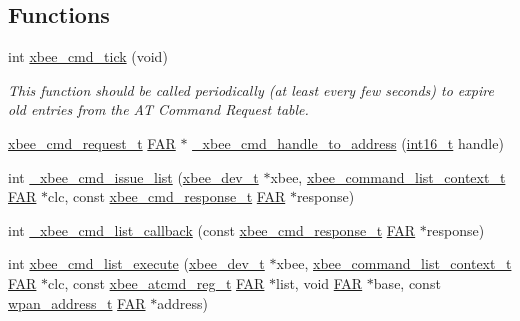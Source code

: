 \subsection*{Functions}
\begin{DoxyCompactItemize}
\item 
int \hyperlink{group__xbee__atcmd_ga7ef08f6771da8c18234bbffca2be4ff3}{xbee\-\_\-cmd\-\_\-tick} (void)
\begin{DoxyCompactList}\small\item\em This function should be called periodically (at least every few seconds) to expire old entries from the A\-T Command Request table. \end{DoxyCompactList}\item 
\hyperlink{structxbee__cmd__request__t}{xbee\-\_\-cmd\-\_\-request\-\_\-t} \hyperlink{group__hal_gaef060b3456fdcc093a7210a762d5f2ed}{F\-A\-R} $\ast$ \hyperlink{group__xbee__atcmd_ga710b2223cda09c52a8518c964da88347}{\-\_\-xbee\-\_\-cmd\-\_\-handle\-\_\-to\-\_\-address} (\hyperlink{group__hal_ga2140805d08462d474b82ddc8d1c2f3e6}{int16\-\_\-t} handle)
\item 
int \hyperlink{group__xbee__atcmd_ga4931ffe3ba31eaf16eee72ac0a95015b}{\-\_\-xbee\-\_\-cmd\-\_\-issue\-\_\-list} (\hyperlink{structxbee__dev__t}{xbee\-\_\-dev\-\_\-t} $\ast$xbee, \hyperlink{structxbee__command__list__context__t}{xbee\-\_\-command\-\_\-list\-\_\-context\-\_\-t} \hyperlink{group__hal_gaef060b3456fdcc093a7210a762d5f2ed}{F\-A\-R} $\ast$clc, const \hyperlink{structxbee__cmd__response__t}{xbee\-\_\-cmd\-\_\-response\-\_\-t} \hyperlink{group__hal_gaef060b3456fdcc093a7210a762d5f2ed}{F\-A\-R} $\ast$response)
\item 
int \hyperlink{group__xbee__atcmd_ga9f1bad1621dfd1d13b6f1102fc592d13}{\-\_\-xbee\-\_\-cmd\-\_\-list\-\_\-callback} (const \hyperlink{structxbee__cmd__response__t}{xbee\-\_\-cmd\-\_\-response\-\_\-t} \hyperlink{group__hal_gaef060b3456fdcc093a7210a762d5f2ed}{F\-A\-R} $\ast$response)
\item 
int \hyperlink{group__xbee__atcmd_gab9fb2f15b9134bd32d937a51e4c68014}{xbee\-\_\-cmd\-\_\-list\-\_\-execute} (\hyperlink{structxbee__dev__t}{xbee\-\_\-dev\-\_\-t} $\ast$xbee, \hyperlink{structxbee__command__list__context__t}{xbee\-\_\-command\-\_\-list\-\_\-context\-\_\-t} \hyperlink{group__hal_gaef060b3456fdcc093a7210a762d5f2ed}{F\-A\-R} $\ast$clc, const \hyperlink{structxbee__atcmd__reg__t}{xbee\-\_\-atcmd\-\_\-reg\-\_\-t} \hyperlink{group__hal_gaef060b3456fdcc093a7210a762d5f2ed}{F\-A\-R} $\ast$list, void \hyperlink{group__hal_gaef060b3456fdcc093a7210a762d5f2ed}{F\-A\-R} $\ast$base, const \hyperlink{structwpan__address__t}{wpan\-\_\-address\-\_\-t} \hyperlink{group__hal_gaef060b3456fdcc093a7210a762d5f2ed}{F\-A\-R} $\ast$address)

\end{DoxyCompactItemize}
